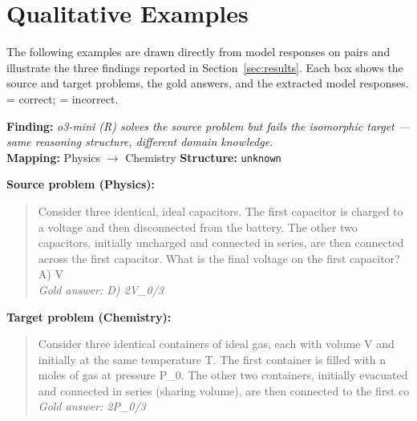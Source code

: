 
\section{Qualitative Examples}
\label{app:examples}

The following examples are drawn directly from model responses on \isosci{}
pairs and illustrate the three findings reported in Section~\ref{sec:results}.
Each box shows the source and target problems, the gold answers, and the
extracted model responses. \cmark{} = correct; \xmark{} = incorrect.

\begin{tcolorbox}[
  colback=gray!5, colframe=gray!40,
  title={\textbf{Example 1: Knowledge-Dependent Gain}},
  fonttitle=\small\bfseries, breakable]

\textbf{Finding:} \textit{o3-mini (R) solves the source problem but fails the isomorphic target — same reasoning structure, different domain knowledge.}
\\[4pt]
\textbf{Mapping:} Physics $\to$ Chemistry \quad
\textbf{Structure:} \texttt{unknown}

\vspace{6pt}
\textbf{Source problem (Physics):}\\
\begin{quote}\small Consider three identical, ideal capacitors. The first capacitor is charged to a voltage and then disconnected from the battery. The other two capacitors, initially uncharged and connected in series, are then connected across the first capacitor. What is the final voltage on the first capacitor?
A) V\\
\textit{Gold answer: D) 2V\_0/3}\end{quote}

\textbf{Target problem (Chemistry):}\\
\begin{quote}\small Consider three identical containers of ideal gas, each with volume V and initially at the same temperature T. The first container is filled with n moles of gas at pressure P\_0. The other two containers, initially evacuated and connected in series (sharing volume), are then connected to the first co\\
\textit{Gold answer: 2P\_0/3}\end{quote}


\end{tcolorbox}
